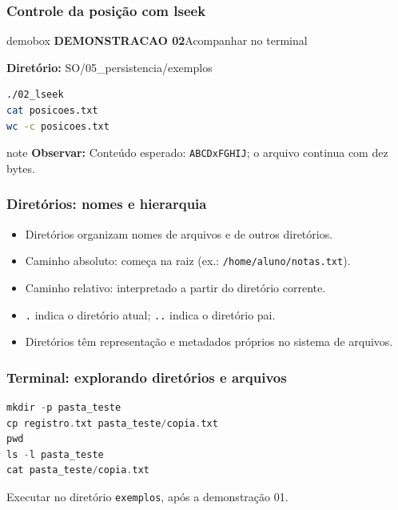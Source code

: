 \documentclass[aspectratio=169,11pt]{beamer}
\begin{document}
\begin{frame}[fragile]
\frametitle{Controle da posição com lseek}
\begin{beamercolorbox}[wd=\textwidth,sep=3mm,rounded=true]{demobox}
{\large\bfseries DEMONSTRACAO 02}\hfill{\normalsize Acompanhar no terminal}
\end{beamercolorbox}
\vspace{2mm}
\textbf{Diretório:} {\ttfamily\small SO/05\_persistencia/exemplos}
\vspace{1mm}
\begin{lstlisting}[language=bash]
./02_lseek
cat posicoes.txt
wc -c posicoes.txt
\end{lstlisting}
\begin{beamercolorbox}[wd=\textwidth,sep=2mm,rounded=true]{note}
\small\textbf{Observar:} Conteúdo esperado: \texttt{ABCDxFGHIJ}; o arquivo continua com dez bytes.
\end{beamercolorbox}
\end{frame}

\begin{frame}
\frametitle{Diretórios: nomes e hierarquia}
\large
\begin{itemize}
\item Diretórios organizam nomes de arquivos e de outros diretórios.
\item Caminho absoluto: começa na raiz (ex.: \texttt{/home/aluno/notas.txt}).
\item Caminho relativo: interpretado a partir do diretório corrente.
\item \texttt{.} indica o diretório atual; \texttt{..} indica o diretório pai.
\item Diretórios têm representação e metadados próprios no sistema de arquivos.
\end{itemize}

\end{frame}

\begin{frame}[fragile]
\frametitle{Terminal: explorando diretórios e arquivos}
\begin{lstlisting}[language=C]
mkdir -p pasta_teste
cp registro.txt pasta_teste/copia.txt
pwd
ls -l pasta_teste
cat pasta_teste/copia.txt
\end{lstlisting}
\vfill\small\textcolor{dkblue}{Executar no diretório \texttt{exemplos}, após a demonstração 01.}

\end{frame}
\end{document}
